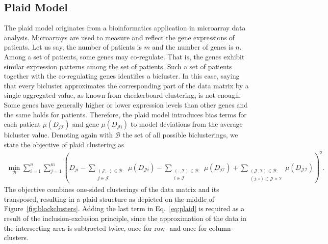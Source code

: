 \subsection{Plaid Model}
The plaid model originates from a bioinformatics application in microarray data analysis. Microarrays are used to measure and reflect the gene expressions of patients. Let us say, the number of patients is $m$ and the number of genes is $n$. Among a set of patients, some genes may co-regulate. That is, the genes exhibit similar expression patterns among the set of patients. Such a set of patients together with the co-regulating genes identifies a bicluster. In this case, saying that every bicluster approximates the corresponding part of the data matrix by a single aggregated value, as known from checkerboard clustering, is not enough. Some genes have generally higher or lower expression levels than other genes and the same holds for patients. Therefore, the plaid model introduces bias terms for each patient $\mu(D_{j\mathcal{I}})$ and gene $\mu(D_{\mathcal{J}i})$ to model deviations from the average bicluster value. Denoting again with $\mathcal{B}$ the set of all possible biclusterings, we state the objective of plaid clustering as
\begin{align}
   \min_{\mathcal{B}} \sum_{i=1}^n\sum_{j=1}^m \left(D_{ji}-\sum_{\substack{(\mathcal{J},\cdot)\in\mathcal{B}:\\  j\in\mathcal{J}}}\mu(D_{\mathcal{J}i}) - \sum_{\substack{(\cdot,\mathcal{I})\in\mathcal{B}:\\  i\in\mathcal{I}}} \mu(D_{j\mathcal{I}})+ \sum_{\substack{(\mathcal{J},\mathcal{I})\in\mathcal{B}:\\  (j,i)\in\mathcal{J}\times\mathcal{I}}} \mu(D_{\mathcal{JI}})\right)^2. \label{eq:plaid}
\end{align}
The objective combines one-sided clusterings of the data matrix and its transposed, resulting in a plaid structure as depicted on the middle of Figure~\ref{fig:blockclusters}. Adding the last term in Eq.~\eqref{eq:plaid} is required as a result of the inclusion-exclusion principle, since the approximation of the data in the intersecting area is subtracted twice, once for row- and once for column-clusters. 

